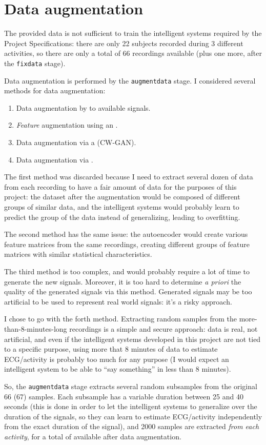 \section{Data augmentation}\label{sec:augmentdata}

The provided data is not sufficient to train the intelligent systems required
by the Project Specifications: there are only 22 subjects recorded during 3
different activities, so there are only a total of 66 recordings available
(plus one more, after the \texttt{fixdata} stage).

Data augmentation is performed by the \texttt{augmentdata} stage. I considered
several methods for data augmentation:
\begin{enumerate}
\item Data augmentation by  to
	available signals.
\item \emph{Feature} augmentation using an .
\item Data augmentation via a  (CW-GAN).
\item Data augmentation via .
\end{enumerate}

The first method was discarded because I need to extract several dozen of data
from each recording to have a fair amount of data for the purposes of this
project: the dataset after the augmentation would be composed of different
groups of similar data, and the intelligent systems would probably learn to
predict the group of the data instead of generalizing, leading to overfitting.

The second method has the same issue: the autoencoder would create various
feature matrices from the same recordings, creating different groups of feature
matrices with similar statistical characteristics.

The third method is too complex, and would probably require a lot of time to
generate the new signals. Moreover, it is too hard to determine \emph{a priori}
the quality of the generated signals via this method. Generated signals may be
too artificial to be used to represent real world signals: it's a risky
approach.

I chose to go with the forth method. Extracting random samples from the
more-than-8-minutes-long recordings is a simple and secure approach: data is
real, not artificial, and even if the intelligent systems developed in this
project are not tied to a specific purpose, using more that 8 minutes of data
to estimate ECG/activity is probably too much for any purpose (I would expect
an intelligent system to be able to ``say something'' in less than 8 minutes).

So, the \texttt{augmentdata} stage extracts several random subsamples from the
original 66 (67) samples. Each subsample has a variable duration between
25 and 40 seconds (this is done in order to let the intelligent systems to
generalize over the duration of the signals, so they can learn to estimate
ECG/activity independently from the exact duration of the signal), and 2000
samples are extracted \emph{from each activity}, for a total of  available after data augmentation.
